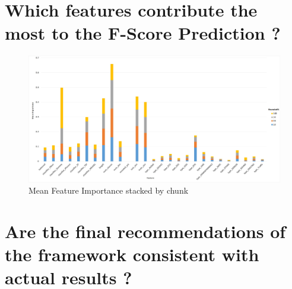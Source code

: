   \section{Which features contribute the most to the F-Score Prediction ?}
    \begin{figure} [!htb]
        \centering
        \includegraphics[width=\textwidth]{./Chapters/06 Results/Feature_Importance_stacked.jpg}
        \caption{Mean Feature Importance stacked by chunk}
    \end{figure}

  \section{Are the final recommendations of the framework consistent with actual results ?}
  
